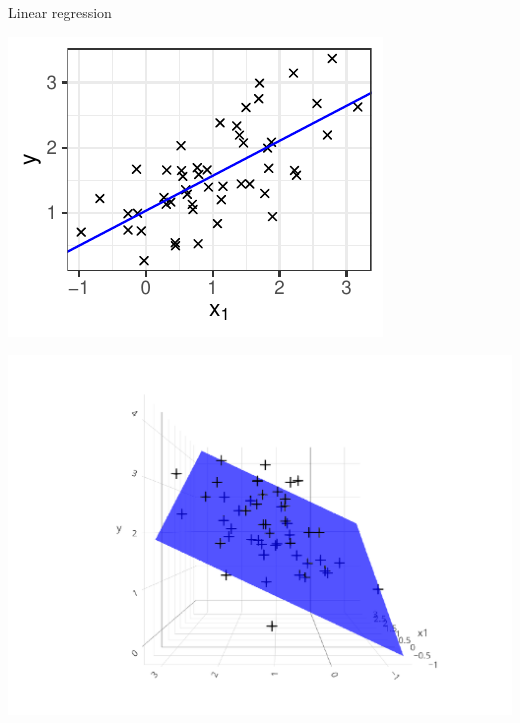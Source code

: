 \documentclass[11pt,compress,t,notes=noshow, xcolor=table]{beamer}
\begin{document}
\begin{frame}{Linear regression}
\begin{itemize}
\end{itemize}
\vfill
\begin{minipage}{0.4\textwidth}
    \includegraphics[width=\textwidth]{figure/reg_l2_basic_lm.pdf} 
\end{minipage}
\hspace{1cm}
\begin{minipage}{0.4\textwidth}
    \includegraphics[width=1.2\textwidth, trim=100 0 0 20, clip]{
    figure/reg_l2_basic_lm_biv.pdf} 
\end{minipage}

\end{frame} 

\end{document}

